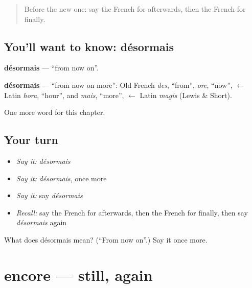 \label{lesson:FR-C156-desormais}



\begin{quote}
Before the new one: say the French for afterwards, then the French for finally.
\end{quote}

\subsection*{You'll want to know: désormais}
\textbf{désormais} — \textquotedblleft{}from now on\textquotedblright{}.

\begin{cousinweb}
\textbf{désormais} — \textquotedblleft{}from now on more\textquotedblright{}: Old French \emph{des}, \textquotedblleft{}from\textquotedblright{}, \emph{ore}, \textquotedblleft{}now\textquotedblright{}, $\leftarrow$ Latin \emph{hora}, \textquotedblleft{}hour\textquotedblright{}, and \emph{mais}, \textquotedblleft{}more\textquotedblright{}, $\leftarrow$ Latin \emph{magis} (Lewis \& Short).
\end{cousinweb}

\begin{grammarlens}[title={What you've built}]
One more word for this chapter.
\end{grammarlens}

\subsection*{Your turn}
\begin{itemize}
\raggedright
  \item \emph{Say it:} \emph{désormais}
  \item \emph{Say it:} \emph{désormais}, once more
  \item \emph{Say it:} say \emph{désormais}
  \item \emph{Recall:} say the French for afterwards, then the French for finally, then say \emph{désormais} again
\end{itemize}

\begin{tcolorbox}[breakable,colback=teal!4,colframe=teal!35!black,title={Before you move on}]
What does désormais mean? (\textquotedblleft{}From now on\textquotedblright{}.) Say it once more.
\end{tcolorbox}
\section[encore]{encore — still, again}

